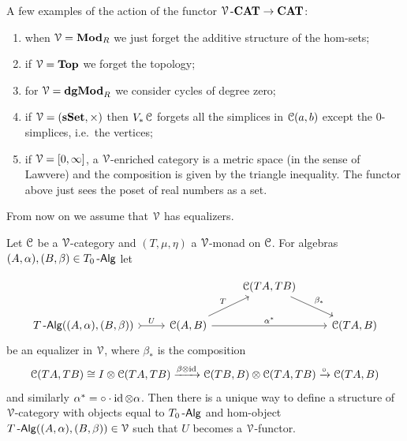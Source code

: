 \documentclass[a4paper,11pt,oneside,openany]{scrbook}
\begin{document}
\begin{exmp}
	A few examples of the action of the functor $\operatorname{\mathcal{V}}\mbox{-}{\normalfont\textbf{CAT}}\to{\normalfont\textbf{CAT}}$:
	\begin{enumerate}
		\item when $\operatorname{\mathcal{V}}={\normalfont\textbf{Mod}}_R$ we just forget the additive structure of the hom-sets;
		\item if $\operatorname{\mathcal{V}}={\normalfont\textbf{Top}}$ we forget the topology;
		\item for $\operatorname{\mathcal{V}}={\normalfont\textbf{dgMod}}_R$ we consider cycles of degree zero;
		\item if $\operatorname{\mathcal{V}}=({\normalfont\textbf{sSet}},\times)$ then $V_*\operatorname{\mathcal{C}}$ forgets all the simplices in $\operatorname{\mathcal{C}}(a,b)$ except the $0$-simplices, i.e.\ the vertices;
		\item if $\operatorname{\mathcal{V}}=[0,\infty]$, a $\operatorname{\mathcal{V}}$-enriched category is a metric space (in the sense of Lawvere) and the composition is given by the triangle inequality. The functor above just sees the poset of real numbers as a set.
	\end{enumerate}
\end{exmp}
From now on we assume that $\operatorname{\mathcal{V}}$ has equalizers.
\begin{prop}
	Let $\operatorname{\mathcal{C}}$ be a $\operatorname{\mathcal{V}}$-category and $(T,\mu,\eta)$ a $\operatorname{\mathcal{V}}$-monad on $\operatorname{\mathcal{C}}$. For algebras $(A,\alpha), (B,\beta)\in T_0\operatorname{-\mathsf{Alg}}$ let
\end{prop}
\[
	\begin{tikzcd}
		&& \C(TA,TB) \arrow[rd, "\beta_*"] &  \\
		T\Alg((A,\alpha),(B,\beta)) \arrow[r, tail, "U"] & \C(A,B) \arrow[rr, "\alpha^*"] \arrow[ru, "T"] &             & \C(TA,B)
	\end{tikzcd}
\]
be an equalizer in $\operatorname{\mathcal{V}}$, where $\beta_*$ is the composition
$$\operatorname{\mathcal{C}}(TA,TB)\cong I\otimes\operatorname{\mathcal{C}}(TA,TB)\xrightarrow{\beta\otimes\operatorname{id}}\operatorname{\mathcal{C}}(TB,B)\otimes\operatorname{\mathcal{C}}(TA,TB)\xrightarrow{\circ}\operatorname{\mathcal{C}}(TA,B)$$
and similarly $\alpha^*=\circ \cdot \operatorname{id}\otimes\alpha$. Then there is a unique way to define a structure of $\operatorname{\mathcal{V}}$-category with objects equal to $T_0\operatorname{-\mathsf{Alg}}$ and hom-object $T\operatorname{-\mathsf{Alg}}((A,\alpha),(B,\beta))\in\operatorname{\mathcal{V}}$ such that $U$ becomes a $\operatorname{\mathcal{V}}$-functor.
\end{document}
